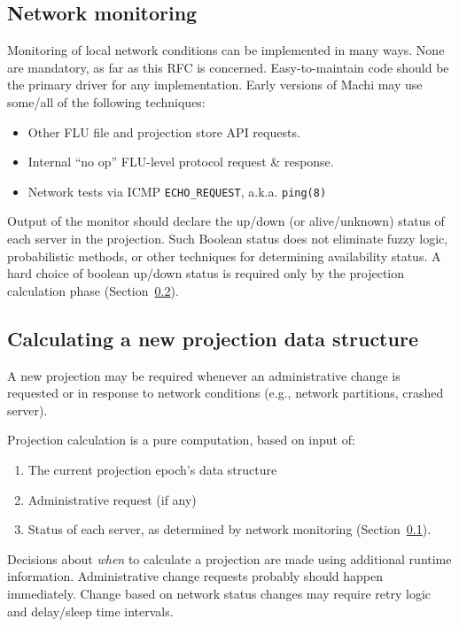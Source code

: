 \documentclass[preprint,10pt]{sigplanconf}
\begin{document}
\subsection{Network monitoring}
\label{sub:network-monitoring}

Monitoring of local network conditions can be implemented in many
ways.  None are mandatory, as far as this RFC is concerned.
Easy-to-maintain code should be the primary driver for any
implementation.  Early versions of Machi may use some/all of the
following techniques:

\begin{itemize}
\item Other FLU file and projection store API requests.
\item Internal ``no op'' FLU-level protocol request \& response.
\item Network tests via ICMP {\tt ECHO\_REQUEST}, a.k.a. {\tt ping(8)}
\end{itemize}

Output of the monitor should declare the up/down (or
alive/unknown) status of each server in the projection.  Such
Boolean status does not eliminate fuzzy logic, probabilistic
methods, or other techniques for determining availability status.
A hard choice of boolean up/down status
is required only by the projection calculation phase
(Section~\ref{sub:projection-calculation}).

\subsection{Calculating a new projection data structure}
\label{sub:projection-calculation}

A new projection may be
required whenever an administrative change is requested or in response
to network conditions (e.g., network partitions, crashed server).

Projection calculation is a pure computation, based on input of:

\begin{enumerate}
\item The current projection epoch's data structure
\item Administrative request (if any)
\item Status of each server, as determined by network monitoring
(Section~\ref{sub:network-monitoring}).
\end{enumerate}

Decisions about {\em when} to calculate a projection are made
using additional runtime information.  Administrative change requests
probably should happen immediately.  Change based on network status
changes may require retry logic and delay/sleep time intervals.
\end{document}
